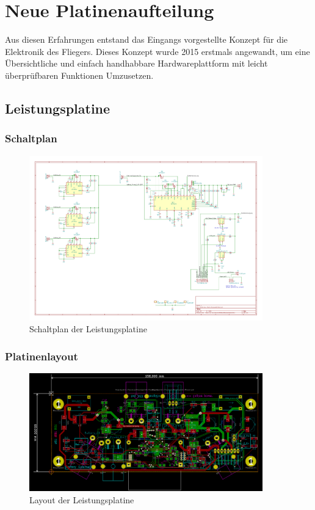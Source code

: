 \section{Neue Platinenaufteilung}

Aus diesen Erfahrungen entstand das Eingangs vorgestellte Konzept für die Elektronik des Fliegers.
Dieses Konzept wurde 2015 erstmals angewandt, um eine Übersichtliche und einfach handhabbare Hardwareplattform mit leicht überprüfbaren Funktionen Umzusetzen.

\subsection{Leistungsplatine}

\subsubsection{Schaltplan}

\begin{figure}[H]
\centering
\includegraphics[width=0.9\textwidth]{bilder/Centerbox/Centerbox-Front-Power_AUVSI16.pdf} 
\caption{Schaltplan der Leistungsplatine} 
\label{fig:Schaltplan der Leistungsplatine}
\end{figure}

\subsubsection{Platinenlayout}

\begin{figure}[H]
\centering
\includegraphics[width=0.9\textwidth]{bilder/Centerbox/Centerbox-Front-Power_AUVSI_2016_rev-01_layout.png} 
\caption{Layout der Leistungsplatine} 
\label{fig:Layout der Leistungsplatine}
\end{figure}


